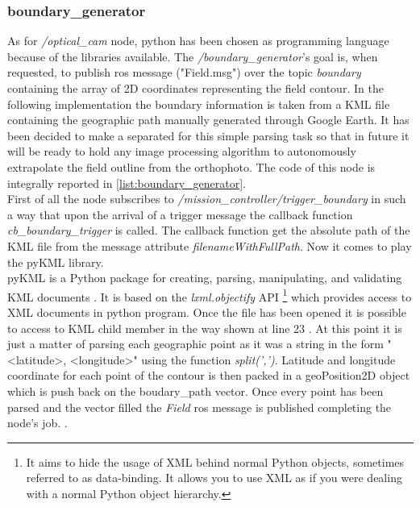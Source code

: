 \subsubsection{boundary\_generator} %
\label{ssub:boundary_generator}
As for \textit{/optical\_cam} node, python has been chosen as programming language because of the libraries available.
The \textit{/boundary\_generator}'s goal is, when requested, to publish \acrshort{ros} message ("Field.msg") over the topic \textit{boundary} containing the array of 2D coordinates representing the field contour.
In the following implementation the boundary information is taken from a KML file containing the geographic path manually generated through Google Earth. It has been decided to make a separated for this simple parsing task so that in future it will be ready to hold any image processing algorithm to autonomously extrapolate the field outline from the orthophoto.
The code of this node is integrally reported in \autoref{list:boundary_generator}.\\
First of all the node subscribes to \textit{/mission\_controller/trigger\_boundary} in such a way that upon the arrival of a trigger message the callback function \textit{cb\_boundary\_trigger} is called. The callback function get the absolute path of the KML file from the message attribute \textit{filenameWithFullPath}. Now it comes to play the pyKML library.\\
pyKML is a Python package for creating, parsing, manipulating, and validating KML documents \cite{pyKML}. It is based on the \textit{lxml.objectify} API \footnote{It aims to hide the usage of XML behind normal Python objects, sometimes referred to as data-binding. It allows you to use XML as if you were dealing with a normal Python object hierarchy.\cite{lxml}} which provides access to XML documents in python program. Once the file has been opened it is possible to access to KML child member in the way shown at line 23 . At this point it is just a matter of parsing each geographic point as it was a string in the form "<latitude>, <longitude>" using the function \textit{split(',')}.
Latitude and longitude coordinate for each point of the contour is then packed in a geoPosition2D object which is push back on the boudary\_path vector. Once every point has been parsed and the vector filled the \textit{Field} \acrshort{ros} message is published completing the node's job.
.

